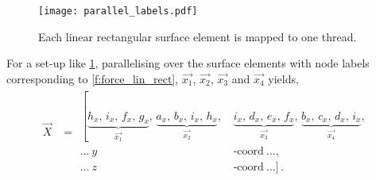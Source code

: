 \begin{figure}
    \centering
    \texttt{[image: parallel\_labels.pdf]}
    \caption[Linear rectangular surface element mapping.]{Each linear rectangular surface element is mapped to one thread.}
    \label{f:paraLabel}
\end{figure}
For a set-up like \cref{f:paraLabel}, parallelising over the surface elements with node labels corresponding to \cref{f:force_lin_rect}, $\vec{x_1}$, $\vec{x_2}$, $\vec{x_3}$ and $\vec{x_4}$ yields,
\begin{align}\label{eq:fcne_eg}
    \vec{X} & = \begin{aligned}
        \left[\underbrace{h_{x},\, i_{x},\, f_{x},\, g_{x}}_{\vec{x_{1}}},\,
        \underbrace{a_{x},\, b_{x},\, i_{x},\, h_{x}}_{\vec{x_{2}}},\,
        \right.  & \underbrace{i_{x},\, d_{x},\, e_{x},\, f_{x}}_{\vec{x_{3}}},\,
        \underbrace{b_{x},\, c_{x},\, d_{x},\, i_{x}}_{\vec{x_{4}}},              \\
        \ldots~y & \textrm{-coord}~\ldots,                                        \\
        \ldots~z & \textrm{-coord}~\ldots]\,.
    \end{aligned}
\end{align}


